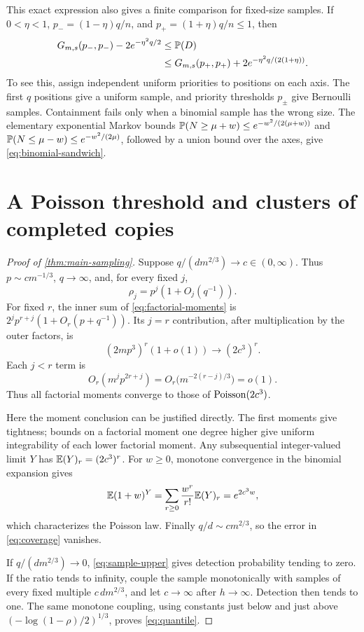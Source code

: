 This exact expression also gives a finite comparison for fixed-size
samples. If \(0<\eta<1\), \(p_-=(1-\eta)q/n\), and
\(p_+=(1+\eta)q/n\le1\), then
\begin{align}
 G_{m,s}(p_-,p_-)-2e^{-\eta^2q/2}
 &\le\mathbb P(D)\notag\\
 &\le G_{m,s}(p_+,p_+)+2e^{-\eta^2q/(2(1+\eta))}.
 \label{eq:binomial-sandwich}
\end{align}
To see this, assign independent uniform priorities to positions on each
axis. The first \(q\) positions give a uniform sample, and priority
thresholds \(p_\pm\) give Bernoulli samples. Containment fails only
when a binomial sample has the wrong size. The elementary exponential
Markov bounds
\(\mathbb P(N\ge\mu+w)\le e^{-w^2/(2(\mu+w))}\) and
\(\mathbb P(N\le\mu-w)\le e^{-w^2/(2\mu)}\), followed by a union bound
over the axes, give \eqref{eq:binomial-sandwich}.

\section{A Poisson threshold and clusters of completed copies}
\label{sec:poisson}

\begin{proof}[Proof of \cref{thm:main-sampling}]
Suppose \(q/(dm^{2/3})\to c\in(0,\infty)\). Thus
\(p\sim cm^{-1/3}\), \(q\to\infty\), and, for every fixed \(j\),
\[
 \rho_j=p^j(1+O_j(q^{-1})).
\]
For fixed \(r\), the inner sum of \eqref{eq:factorial-moments} is
\(2^jp^{r+j}(1+O_r(p+q^{-1}))\). Its \(j=r\) contribution, after
multiplication by the outer factors, is
\[
 (2mp^3)^r(1+o(1))\longrightarrow(2c^3)^r.
\]
Each \(j<r\) term is
\[
 O_r(m^jp^{2r+j})
 =O_r\bigl(m^{-2(r-j)/3}\bigr)=o(1).
\]
Thus all factorial moments converge to those of \(\operatorname{Poisson}(2c^3)\).

Here the moment conclusion can be justified directly. The first moments
give tightness; bounds on a factorial moment one degree higher give
uniform integrability of each lower factorial moment. Any subsequential
integer-valued limit \(Y\) has \(\mathbb E(Y)_{r}=(2c^3)^r\). For \(w\ge0\),
monotone convergence in the binomial expansion gives
\[
 \mathbb E(1+w)^Y=\sum_{r\ge0}\frac{w^r}{r!}\mathbb E(Y)_{r}=e^{2c^3w},
\]
which characterizes the Poisson law. Finally \(q/d\sim cm^{2/3}\),
so the error in \eqref{eq:coverage} vanishes.

If \(q/(dm^{2/3})\to0\), \eqref{eq:sample-upper} gives detection
probability tending to zero. If the ratio tends to infinity, couple
the sample monotonically with samples of every fixed multiple
\(c\,dm^{2/3}\), and let \(c\to\infty\) after \(h\to\infty\).
Detection then tends to one. The same monotone coupling, using constants
just below and just above
\((-\log(1-\rho)/2)^{1/3}\), proves \eqref{eq:quantile}.
\end{proof}

